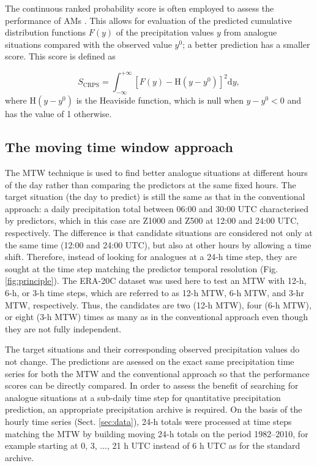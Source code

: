 \documentclass[hess, manuscript]{copernicus}
\begin{document}
	The continuous ranked probability score \citep[CRPS,][]{Brown1974, Matheson1976, Hersbach2000} is often employed to assess the performance of AMs \citep[e.g.][]{Bontron2004, Bontron2005, BenDaoud2008, Horton2012, Marty2012, Radanovics2013, Chardon2014, Junk2015, BenDaoud2016, Caillouet2016}. This allows for evaluation of the predicted cumulative distribution functions $F(y)$ of the precipitation values $y$ from analogue situations compared with the observed value $y^{0}$; a better prediction has a smaller score. This score is defined as 
	
	\begin{equation}
	\label{eq:CRPS}
	S_{\text{CRPS}} = \int_{-\infty}^{+\infty} \left[ F(y)-\text{H}(y-y^{0})\right]^{2} \text{d}y ,  
	\end{equation}
	where $\text{H}(y-y^{0})$ is the Heaviside function, which is null when $y-y^{0}<0$ and has the value of 1 otherwise.
	
	
	\subsection{The moving time window approach}
	\label{sec:mtw}
	
	The MTW technique is used to find better analogue situations at different hours of the day rather than comparing the predictors at the same fixed hours. The target situation (the day to predict) is still the same as that in the conventional approach: a daily precipitation total between 06:00 and 30:00 UTC characterised by predictors, which in this case are Z1000 and Z500 at 12:00 and 24:00 UTC, respectively. The difference is that candidate situations are considered not only at the same time (12:00 and 24:00 UTC), but also at other hours by allowing a time shift. Therefore, instead of looking for analogues at a 24-h time step, they are sought at the time step matching the predictor temporal resolution (Fig. \ref{fig:principle}). The ERA-20C dataset was used here to test an MTW with 12-h, 6-h, or 3-h time steps, which are referred to as 12-h MTW, 6-h MTW, and 3-hr MTW, respectively. Thus, the candidates are two (12-h MTW), four (6-h MTW), or eight (3-h MTW) times as many  as in the conventional approach even though they are not fully independent.
	
	The target situations and their corresponding observed precipitation values do not change. The predictions are asessed on the exact same precipitation time series for both the MTW and the conventional approach so that the performance scores can be directly compared. In order to assess the benefit of searching for analogue situations at a sub-daily time step for quantitative precipitation prediction, an appropriate precipitation archive is required. On the basis of the hourly time series (Sect. \ref{sec:data}), 24-h totals were processed at time steps matching the MTW by building moving 24-h totals on the period 1982--2010, for example starting at 0, 3, ..., 21 h UTC instead of 6 h UTC as for the standard archive.
	
\end{document}
